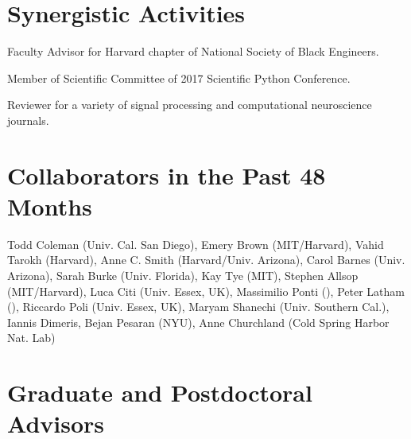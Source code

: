 \documentclass[11pt]{article}
\def\HCode#1{}
\renewenvironment{itemize}{
  \begin{list}{}{
    \setlength{\itemsep}{0.25em}
    \setlength{\parskip}{0pt}
    \setlength{\parsep}{0.25em}
  }
}{
  \end{list}
}
\begin{document}


\HCode{<a name="journalpapers"></a>}
%
%
%


%
%
%
%
%
%

\section*{Synergistic Activities}

\begin{itemize}
  \item Faculty Advisor for Harvard chapter of National Society of Black Engineers.
  \item Member of Scientific Committee of 2017 Scientific Python Conference.
  \item Reviewer for a variety of signal processing and computational neuroscience journals.
\end{itemize}

\section*{Collaborators in the Past 48 Months}

Todd Coleman (Univ. Cal. San Diego), Emery Brown (MIT/Harvard), Vahid Tarokh (Harvard), Anne C. Smith (Harvard/Univ. Arizona), Carol Barnes (Univ. Arizona), Sarah Burke (Univ. Florida), Kay Tye (MIT), Stephen Allsop (MIT/Harvard), Luca Citi (Univ. Essex, UK), Massimilio Ponti (), Peter Latham (), Riccardo Poli (Univ. Essex, UK), Maryam Shanechi (Univ. Southern Cal.), Iannis Dimeris, Bejan Pesaran (NYU), Anne Churchland (Cold Spring Harbor Nat. Lab)

\section*{Graduate and Postdoctoral Advisors}
\end{document}
